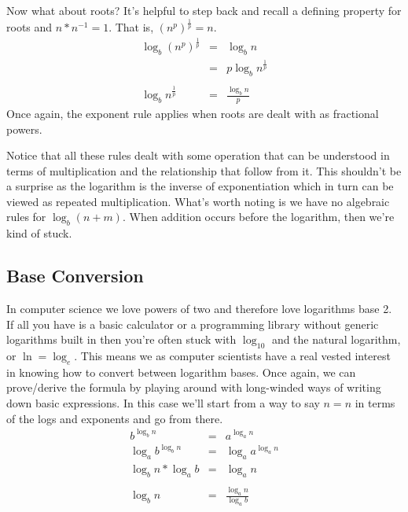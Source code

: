 \documentclass[nobib]{tufte-handout}
\begin{document}
Now what about roots? It's helpful to step back and recall a defining property for roots and $n*n^{-1}=1$. That is, $ {(n^p)}^{\frac{1}{p}} = n $.
\begin{equation}
  \begin{array}{rcl}
    \log_b{ {(n^p)}^{\frac{1}{p}} } &=&  \log_b{n}\\
     &=& p\log_b{ n^{\frac{1}{p}} } \\ \\
    \log_b{ n^{\frac{1}{p}} } &=& \frac{\log_b{n}}{p}
  \end{array}
\end{equation}
Once again, the exponent rule applies when roots are dealt with as fractional powers.

Notice that all these rules dealt with some operation that can be understood in terms of multiplication and the relationship that follow from it. This shouldn't be a surprise as the logarithm is the inverse of exponentiation which in turn can be viewed as repeated multiplication. What's worth noting is we have no algebraic rules for $\log_b{(n+m)}$. When addition occurs before the logarithm, then we're kind of stuck.

\subsection{Base Conversion}

In computer science we love powers of two and therefore love logarithms base 2. If all you have is a basic calculator or a programming library without generic logarithms built in then you're often stuck with $\log_{10}$ and the natural logarithm, or $\ln = \log_e$. This means we as computer scientists have a real vested interest in knowing how to convert between logarithm bases.  Once again, we can prove/derive the formula by playing around with long-winded ways of writing down basic expressions.  In this case we'll start from a way to say $n=n$ in terms of the logs and exponents and go from there.
\begin{equation}
  \begin{array}{rcl}
    b^{\log_b{n}} &=& a^{\log_a{n}} \\
    \log_a{ b^{\log_b{n}} } &=& \log_a{ a^{\log_a{n}} } \\
    \log_b{n}*\log_a{b} &=& \log_a{n} \\ \\
    \log_b{n} &=& \frac{\log_a{n}}{ \log_a{b} }
  \end{array}
\end{equation}
\end{document}
